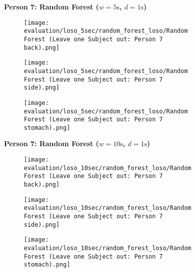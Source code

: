 \begin{figure}
    \textbf{Person 7: Random Forest ($w=5\si{\s}$, $d=1\si{\s}$)}
      \centering
      \begin{subfigure}{1\textwidth}
          \texttt{[image: evaluation/loso\_5sec/random\_forest\_loso/Random Forest (Leave one Subject out: Person 7 back).png]}
        \end{subfigure}
        \begin{subfigure}{1\textwidth}
          \texttt{[image: evaluation/loso\_5sec/random\_forest\_loso/Random Forest (Leave one Subject out: Person 7 side).png]}
        \end{subfigure}
        \begin{subfigure}{1\textwidth}
          \texttt{[image: evaluation/loso\_5sec/random\_forest\_loso/Random Forest (Leave one Subject out: Person 7 stomach).png]}
      \end{subfigure}
        \textbf{Person 7: Random Forest ($w=10\si{\s}$, $d=1\si{\s}$)}
      \centering
      \begin{subfigure}{1\textwidth}
          \texttt{[image: evaluation/loso\_10sec/random\_forest\_loso/Random Forest (Leave one Subject out: Person 7 back).png]}
        \end{subfigure}
        \begin{subfigure}{1\textwidth}
          \texttt{[image: evaluation/loso\_10sec/random\_forest\_loso/Random Forest (Leave one Subject out: Person 7 side).png]}
        \end{subfigure}
        \begin{subfigure}{1\textwidth}
          \texttt{[image: evaluation/loso\_10sec/random\_forest\_loso/Random Forest (Leave one Subject out: Person 7 stomach).png]}
      \end{subfigure}
  
      \label{evaluation:random_forest_loso:person7}
\end{figure}
